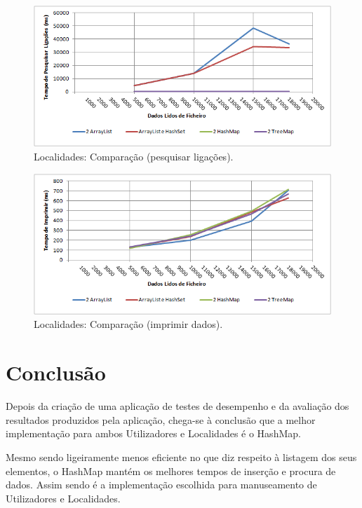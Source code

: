 \documentclass[a5paper,twocolumn, 11pt]{article}
\begin{document}
\begin{figure}[h!b!t!]
    \caption[Localidades: Comparação (pesquisar ligações)]{Localidades: Comparação (pesquisar ligações).}
    \label{hashtable}
    \centering
        \includegraphics[width=400pt]{cloc_o4.png}
\end{figure}
\begin{figure}[h!b!t!]
    \caption[Localidades: Comparação (imprimir dados)]{Localidades: Comparação (imprimir dados).}
    \label{hashtable}
    \centering
        \includegraphics[width=400pt]{cloc_o5.png}
\end{figure}


\clearpage
\section{Conclusão}
Depois da criação de uma aplicação de testes de desempenho e da avaliação dos resultados produzidos pela aplicação, chega-se à conclusão que a melhor implementação para ambos Utilizadores e Localidades é o HashMap.

Mesmo sendo ligeiramente menos eficiente no que diz respeito à listagem dos seus elementos, o HashMap mantém os melhores tempos de inserção e procura de dados. Assim sendo é a implementação escolhida para manuseamento de Utilizadores e Localidades.
\end{document}
